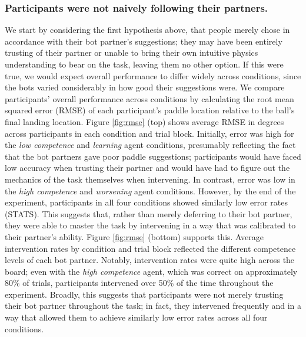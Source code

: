 \documentclass[10pt,letterpaper]{article}
\begin{document}
\subsubsection{Participants were not naively following their partners.} We start by considering the first hypothesis above, that people merely chose in accordance with their bot partner's suggestions; they may have been entirely trusting of their partner or unable to bring their own intuitive physics understanding to bear on the task, leaving them no other option. If this were true, we would expect overall performance to differ widely across conditions, since the bots varied considerably in how good their suggestions were. We compare participants' overall performance across conditions by calculating the root mean squared error (RMSE) of each participant's paddle location relative to the ball's final landing location. Figure \ref{fig:rmse} (top) shows average RMSE in degrees across participants in each condition and trial block. Initially, error was high for the \textit{low competence} and \textit{learning} agent conditions, presumably reflecting the fact that the bot partners gave poor paddle suggestions; participants would have faced low accuracy when trusting their partner and would have had to figure out the mechanics of the task themselves when intervening. In contrast, error was low in the \textit{high competence} and \textit{worsening} agent conditions. However, by the end of the experiment, participants in all four conditions showed similarly low error rates (STATS). This suggests that, rather than merely deferring to their bot partner, they were able to master the task by intervening in a way that was calibrated to their partner's ability. Figure \ref{fig:rmse} (bottom) supports this. Average intervention rates by condition and trial block reflected the different competence levels of each bot partner. Notably, intervention rates were quite high across the board; even with the \textit{high competence} agent, which was correct on approximately 80\% of trials, participants intervened over 50\% of the time throughout the experiment. Broadly, this suggests that participants were not merely trusting their bot partner throughout the task; in fact, they intervened frequently and in a way that allowed them to achieve similarly low error rates across all four conditions. 
\end{document}

